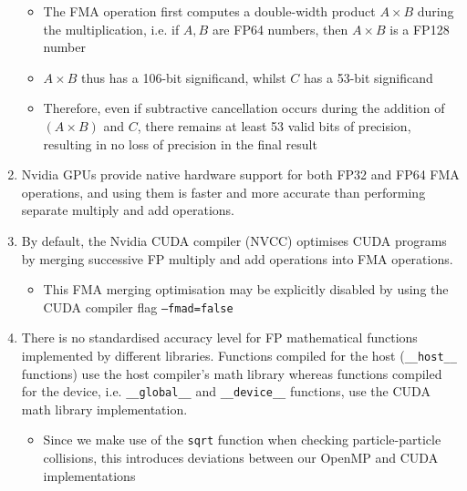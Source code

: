 \documentclass[12pt]{article}
\begin{document}
\begin{enumerate}
    \begin{itemize}
        \item The FMA operation first computes a double-width product $A \times B$ during the multiplication, i.e. if $A, B$ are FP64 numbers, then $A \times B$ is a FP128 number
        \item $A \times B$ thus has a 106-bit significand, whilst $C$ has a 53-bit significand
        \item Therefore, even if subtractive cancellation occurs during the addition of $(A \times B)$ and $C$, there remains at least 53 valid bits of precision, resulting in no loss of precision in the final result
    \end{itemize}
    \item Nvidia GPUs provide native hardware support for both FP32 and FP64 FMA operations, and using them is faster and more accurate than performing separate multiply and add operations.
    \item By default, the Nvidia CUDA compiler (NVCC) optimises CUDA programs by merging successive FP multiply and add operations into FMA operations.
    \begin{itemize}
        \item This FMA merging optimisation may be explicitly disabled by using the CUDA compiler flag \texttt{--fmad=false}
    \end{itemize}
    \item There is no standardised accuracy level for FP mathematical functions implemented by different libraries. Functions compiled for the host (\texttt{\_\_host\_\_} functions) use the host compiler's math library whereas functions compiled for the device, i.e. \texttt{\_\_global\_\_} and \texttt{\_\_device\_\_} functions, use the CUDA math library implementation.
    \begin{itemize}
        \item Since we make use of the \texttt{sqrt} function when checking particle-particle collisions, this introduces deviations between our OpenMP and CUDA implementations
    \end{itemize} 
\end{enumerate}
\end{document}
